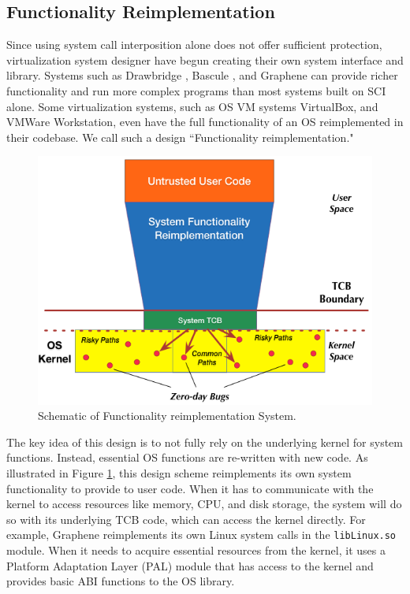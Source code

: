 \subsection{Functionality Reimplementation}
Since using system call interposition alone does not offer sufficient protection,
virtualization system designer have begun creating their own system
interface and library. Systems such as  Drawbridge \cite{Drawbridge-11},
 Bascule \cite{Bascule}, and Graphene \cite{Graphene-14} can
provide richer functionality and run more complex programs than most systems built
on SCI alone. Some virtualization
systems, such as OS VM systems VirtualBox, and VMWare Workstation, even have the
full functionality of an OS reimplemented in their codebase. We call such a design
``Functionality reimplementation."

\begin{figure}%
\centering
\includegraphics[width=1.0\columnwidth]{diagram/Virtualization_Design_Model_02.png}
\caption{\small Schematic of Functionality reimplementation System.}
\label{fig:design_functionality_reimplementation}
\end{figure}

The key idea of this design is to not fully rely on the underlying
kernel for system functions. Instead, essential OS functions are re-written with new
code. As illustrated in Figure \ref{fig:design_functionality_reimplementation},
 this design scheme reimplements its own system functionality to provide to user code.
 When it has to communicate with the kernel
to access resources like memory, CPU, and disk storage, the system will do so with
its underlying TCB code, which can access the kernel directly.
For example, Graphene \cite{Graphene-14} reimplements
its own Linux system calls in the
\texttt{libLinux.so} module. When it needs to acquire essential resources from
the kernel, it uses a
Platform Adaptation Layer (PAL)  module that has access to the kernel
and provides basic ABI functions to the OS library.

